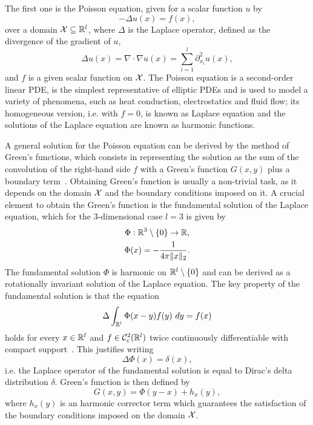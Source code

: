 The first one is the Poisson equation, given for a scalar function $u$ by 
\begin{equation}\label{eq:Poisson}
    -\Delta u(x) = f(x), 
\end{equation}
over a domain $\mathcal X \subseteq \mathbb{R}^l$, where $\Delta$ is the Laplace operator, defined as the divergence of the gradient of $u$, 
\[
    \Delta u(x) = \nabla \cdot \nabla u(x) = \sum_{i=1}^{l} \partial^2_{x_i} u(x), 
\] and $f$ is a given scalar function on $\mathcal X$.
The Poisson equation is a second-order linear PDE, is the simplest representative of elliptic PDEs and is used to model a variety of phenomena, such as heat conduction, electrostatics and fluid flow; its homogeneous version, i.e. with $f=0$, is known as Laplace equation and the solutions of the Laplace equation are known as harmonic functions.

A general solution for the Poisson equation can be derived by the method of Green's functions, which consists in representing the solution as the sum of the convolution of the right-hand side $f$ with a Green's function $G(x,y)$ plus a boundary term~\cite[Chapter 2.2, Theorem 12]{Evans2010}.
Obtaining Green's function is usually a non-trivial task, as it depends on the domain $\mathcal X$ and the boundary conditions imposed on it.
A crucial element to obtain the Green's function is the fundamental solution of the Laplace equation, which for the 3-dimensional case $l=3$ is given by
\begin{equation}\label{eq:Poisson-fundamental-solution}
    \begin{gathered}
        \Phi : \mathbb{R}^3 \setminus \{0\} \rightarrow \mathbb{R}, \\
        \Phi(x) =  -\frac{1}{4\pi \|x \|_2}.
    \end{gathered}
\end{equation}
The fundamental solution $\Phi$ is harmonic on $\mathbb{R}^l\setminus \{0\}$ and can be derived as a rotationally invariant solution of the Laplace equation.
The key property of the fundamental solution is that the equation 
\[ 
    \Delta \int_{\mathbb{R}^l} \Phi(x-y) f(y) \ dy = f(x) 
\]
holds for every $x \in \mathbb{R}^l$ and $f \in \mathcal C^2_c(\mathbb{R}^l)$ twice continuously differentiable with compact support~\cite[Theorem 1]{Evans2010}.
This justifies writing \[
    \Delta \Phi(x) = \delta(x),
\]
i.e. the Laplace operator of the fundamental solution is equal to Dirac's delta distribution $\delta$.
Green's function is then defined by 
\[
    G(x,y) = \Phi(y-x) + h_x(y),
\]
where $h_x(y)$ is an harmonic corrector term which guarantees the satisfaction of the boundary conditions imposed on the domain $\mathcal X$. \medskip

